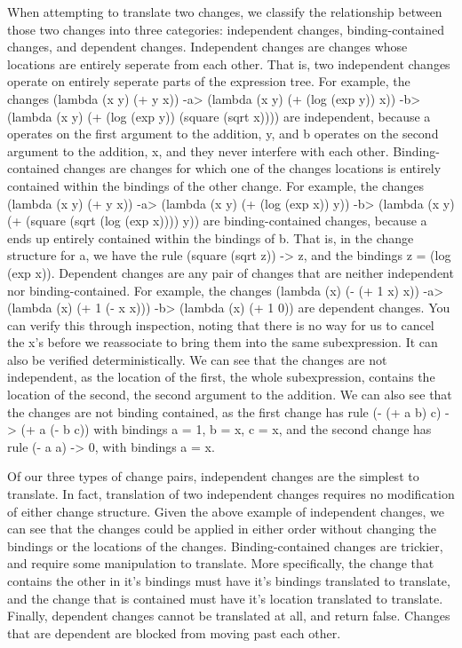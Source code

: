 \documentclass{article}
\begin{document}
When attempting to translate two changes, 
we classify the relationship between those two changes 
into three categories: 
independent changes, 
binding-contained changes, 
and dependent changes. 
Independent changes are changes whose locations 
are entirely seperate from each other. 
That is, 
two independent changes operate 
on entirely seperate parts 
of the expression tree. 
For example, 
the changes (lambda (x y) (+ y x)) -a> 
(lambda (x y) (+ (log (exp y)) x)) -b> 
(lambda (x y) (+ (log (exp y)) (square (sqrt x)))) 
are independent, 
because a operates 
on the first argument to the addition, 
y, 
and b operates 
on the second argument to the addition, 
x, 
and they never interfere with each other. 
Binding-contained changes are changes 
for which one of the changes locations 
is entirely contained within the bindings of the other change. 
For example, 
the changes (lambda (x y) (+ y x)) -a> 
(lambda (x y) (+ (log (exp x)) y)) -b> 
(lambda (x y) (+ (square (sqrt (log (exp x)))) y)) 
are binding-contained changes, 
because a ends up entirely contained within the bindings of b. 
That is, 
in the change structure for a, 
we have the rule (square (sqrt z)) -> 
z, 
and the bindings z = (log (exp x)). 
Dependent changes are any pair of changes 
that are neither independent nor binding-contained. 
For example, 
the changes (lambda (x) (- (+ 1 x) x)) -a> 
(lambda (x) (+ 1 (- x x))) -b> 
(lambda (x) (+ 1 0)) are dependent changes. 
You can verify this through inspection, 
noting that there is no way 
for us to cancel the x's 
before we reassociate 
to bring them into the same subexpression. 
It can also be verified deterministically. 
We can see that the changes are not independent, 
as the location of the first, 
the whole subexpression, 
contains the location of the second, 
the second argument to the addition. 
We can also see that the changes are not binding contained, 
as the first change has rule (- (+ a b) c) -> (+ a (- b c)) 
with bindings a = 1, 
b = x, 
c = x, 
and the second change has rule (- a a) -> 0, 
with bindings a = x.

Of our three types of change pairs, 
independent changes are the simplest to translate. 
In fact, 
translation of two independent changes 
requires no modification of either change structure. 
Given the above example of independent changes, 
we can see that the changes could be applied 
in either order 
without changing the bindings 
or the locations of the changes. 
Binding-contained changes are trickier, 
and require some manipulation to translate. 
More specifically, 
the change that contains the other in it's 
bindings must have it's bindings translated 
to translate, 
and the change that is contained 
must have it's location translated 
to translate. 
Finally, dependent changes cannot be translated at all, 
and return false. 
Changes that are dependent 
are blocked from moving past each other.
\end{document}
